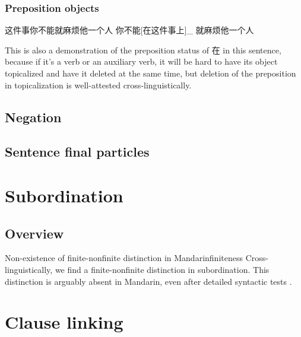 \documentclass[UTF8, a4paper, oneside, scheme=plain]{ctexrep}
\begin{document}
\subsection{Preposition objects}

\begin{exe}
    \ex 这件事你不能就麻烦他一个人
    \ex 你不能[在这件事上]_{} 就麻烦他一个人
\end{exe}
This is also a demonstration of the preposition status of 在 in this sentence,
because if it's a verb or an auxiliary verb,
it will be hard to have its object topicalized and have it deleted at the same time,
but deletion of the preposition in topicalization is well-attested cross-linguistically.

\section{Negation}\label{sec:negation}

\section{Sentence final particles}


\chapter{Subordination}

\section{Overview}



\begin{infobox}{Non-existence of finite-nonfinite distinction in Mandarin}{finiteness}
    Cross-linguistically, we find a finite-nonfinite distinction in subordination.
    This distinction is arguably absent in Mandarin,
    even after detailed syntactic tests \citep{no-finite}.
\end{infobox}

\chapter{Clause linking}\label{chap:clause-linking}



\end{document}
